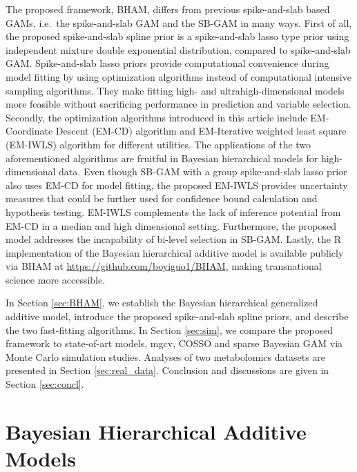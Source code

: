 \documentclass[AMA,STIX1COL,]{WileyNJD-v2}
\begin{document}
The proposed framework, BHAM, differs from previous spike-and-slab based
GAMs, i.e.~the spike-and-slab GAM \citep{Scheipl2012} and the SB-GAM
\citep{Bai2021} in many ways. First of all, the proposed spike-and-slab
spline prior is a spike-and-slab lasso type prior using independent
mixture double exponential distribution, compared to spike-and-slab GAM.
Spike-and-slab lasso priors provide computational convenience during
model fitting by using optimization algorithms instead of computational
intensive sampling algorithms. They make fitting high- and
ultrahigh-dimensional models more feasible without sacrificing
performance in prediction and variable selection. Secondly, the
optimization algorithms introduced in this article include EM-Coordinate
Descent (EM-CD) algorithm and EM-Iterative weighted least square
(EM-IWLS) algorithm for different utilities. The applications of the two
aforementioned algorithms are fruitful in Bayesian hierarchical models
for high-dimensional data. \citep{Yi2012, Rockova2014a, Rockova2018}
Even though SB-GAM with a group spike-and-slab lasso prior also uses
EM-CD for model fitting, the proposed EM-IWLS provides uncertainty
measures that could be further used for confidence bound calculation and
hypothesis testing. EM-IWLS complements the lack of inference potential
from EM-CD in a median and high dimensional setting. Furthermore, the
proposed model addresses the incapability of bi-level selection in
SB-GAM. Lastly, the R implementation of the Bayesian hierarchical
additive model is available publicly via BHAM at
\url{https://github.com/boyiguo1/BHAM}, making transnational science
more accessible.

In Section \ref{sec:BHAM}, we establish the Bayesian hierarchical
generalized additive model, introduce the proposed spike-and-slab spline
priors, and describe the two fast-fitting algorithms. In Section
\ref{sec:sim}, we compare the proposed framework to state-of-art models,
mgcv, COSSO and sparse Bayesian GAM via Monte Carlo simulation studies.
Analyses of two metabolomics datasets are presented in Section
\ref{sec:real_data}. Conclusion and discussions are given in Section
\ref{sec:concl}.

\hypertarget{bayesian-hierarchical-additive-models}{%
\section{Bayesian Hierarchical Additive
Models}\label{bayesian-hierarchical-additive-models}}

\label{sec:BHAM}
\end{document}
